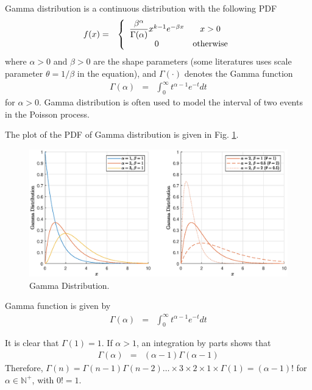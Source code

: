Gamma distribution is a continuous distribution with the following PDF
\begin{eqnarray}
  f(x) &=& \left\{\begin{array}{cc}
                    \dfrac{\beta^\alpha}{\Gamma(\alpha)}x^{k-1}e^{-\beta x} & x > 0 \\
                    0 & \textup{otherwise}
                  \end{array}\right. \label{eq:gammapdf}
\end{eqnarray}
where $\alpha>0$ and $\beta>0$ are the shape parameters (some literatures uses scale parameter $\theta = 1/\beta$ in the equation), and $\Gamma(\cdot)$ denotes the Gamma function
\begin{eqnarray}
  \Gamma(\alpha) &=& \int_{0}^{\infty}t^{\alpha-1}e^{-t}dt \nonumber
\end{eqnarray}
for $\alpha > 0$. Gamma distribution is often used to model the interval of two events in the Poisson process.

The plot of the PDF of Gamma distribution is given in Fig. \ref{fig:gamma_pdf}.
\begin{figure}
	\centering
	\includegraphics[width=350pt]{chapters/ch-commonly-seen-distributions/figs/gamma_pdf.eps}
	\caption{Gamma Distribution.} \label{fig:gamma_pdf}
\end{figure}

\begin{shortbox}

Gamma function is given by
\begin{eqnarray}
  \Gamma(\alpha) &=& \int_{0}^{\infty}t^{\alpha-1}e^{-t}dt \nonumber
\end{eqnarray}

It is clear that $\Gamma(1)=1$. If $\alpha > 1$, an integration by parts shows that
\begin{eqnarray}
  \Gamma(\alpha) &=& (\alpha-1)\Gamma(\alpha-1) \nonumber
\end{eqnarray}
Therefore, $\Gamma(n)=\Gamma(n-1)\Gamma(n-2)\ldots \times 3 \times 2 \times 1 \times \Gamma(1) = (\alpha-1)!$ for $\alpha \in \mathbb{N}^+$, with $0!=1$.

\end{shortbox}

